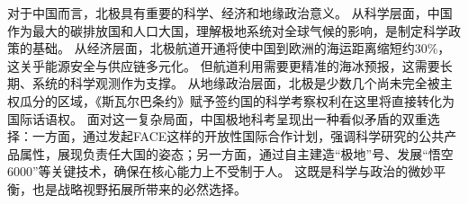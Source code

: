\documentclass[12pt, a4paper]{article}
\begin{document}
对于中国而言，北极具有重要的科学、经济和地缘政治意义。
从科学层面，中国作为最大的碳排放国和人口大国，理解极地系统对全球气候的影响，是制定科学政策的基础。
从经济层面，北极航道开通将使中国到欧洲的海运距离缩短约30\%，这关乎能源安全与供应链多元化。
但航道利用需要更精准的海冰预报，这需要长期、系统的科学观测作为支撑。
从地缘政治层面，北极是少数几个尚未完全被主权瓜分的区域，《斯瓦尔巴条约》赋予签约国的科学考察权利在这里将直接转化为国际话语权。
面对这一复杂局面，中国极地科考呈现出一种看似矛盾的双重选择：一方面，通过发起FACE这样的开放性国际合作计划，强调科学研究的公共产品属性，展现负责任大国的姿态；另一方面，通过自主建造“极地”号、发展“悟空6000”等关键技术，确保在核心能力上不受制于人。
这既是科学与政治的微妙平衡，也是战略视野拓展所带来的必然选择。
\end{document}
